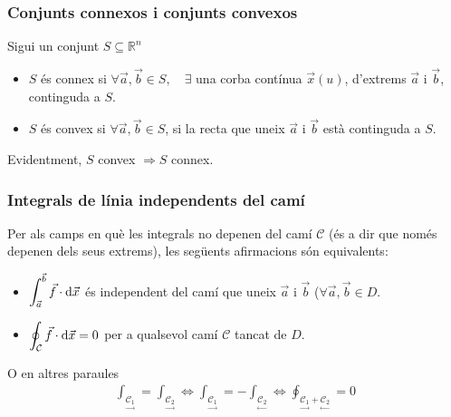 \subsubsection*{Conjunts connexos i conjunts convexos}
Sigui un conjunt $S \subseteq \mathbb{R}^{n}$
\begin{itemize}
    \item $S$ és connex si $\forall \vec{a}, \vec{b} \in S, \quad \exists$ una corba contínua $\vec{x}(u)$, d'extrems $\vec{a}$ i $\vec{b}$, continguda a $S$.
    \item $S$ és convex si $\forall \vec{a}, \vec{b} \in S$, si la recta que uneix $\vec{a}$ i $\vec{b}$ està continguda a $S$.
\end{itemize}
Evidentment, $S$ convex $\Rightarrow S$ connex.

\subsubsection*{Integrals de línia independents del camí}
Per als camps en què les integrals no depenen del camí $\mathcal{C}$ (és a dir que només depenen dels seus extrems), les següents afirmacions són equivalents:
\begin{itemize}
    \item $\displaystyle \int_{\vec{a}}^{\vec{b}} \vec{f} \cdot \mathrm{d} \vec{x}$ és independent del camí que uneix $\vec{a}$ i $\vec{b}$ ($\forall \vec{a}, \vec{b} \in D$.
    \item $\displaystyle \oint_{\mathcal{C}} \vec{f} \cdot \mathrm{d} \vec{x} = 0$ per a qualsevol camí $\mathcal{C}$ tancat de $D$.
\end{itemize}
O en altres paraules
\begin{align}
    \int_{\underset{\to}{\mathcal{C}_{1}}} = \int_{\underset{\to}{\mathcal{C}_{2}}} \Leftrightarrow \int_{\underset{\to}{\mathcal{C}_{1}}} = - \int_{\underset{\leftarrow}{\mathcal{C}_{2}}} \Leftrightarrow \oint_{\underset{\to}{\mathcal{C}_{1}} + \underset{\leftarrow}{\mathcal{C}_{2}}} = 0
\end{align}

